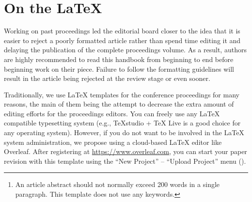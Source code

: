 \documentclass[a4paper]{jpconf}
\begin{document}


\begin{abstract}
This article provides a detailed guide on formatting papers for publication in \iopp\ journals. Based on the ``jpconf'' document class, it offers an overview of the essential formatting elements and common variations authors should utilize when preparing their manuscripts. The paper covers aspects such as structuring the document, formatting text and equations, inserting figures and tables, and managing citations and references using \BibTeX{}. Additionally, it provides best practices for exporting citations. This guide aims to streamline the submission process, enhance the quality of manuscripts, and ensure compliance with \iopp{} standards. By following these instructions, authors can improve their chances of successful publication and contribute to the efficiency of the peer review and publishing process.\footnote{An article abstract should not normally exceed 200 words in a single paragraph. This template does not use any keywords.}
\end{abstract}
%

\section{On the \LaTeX}

Working on past proceedings led the editorial board closer to the idea that it is easier to reject a poorly formatted article rather than spend time editing it and delaying the publication of the complete proceedings volume. As a result, authors are highly recommended to read this handbook from beginning to end before beginning work on their piece. Failure to follow the formatting guidelines will result in the article being rejected at the review stage or even sooner.

Traditionally, we use \LaTeX{} templates for the conference proceedings for many reasons, the main of them being the attempt to decrease the extra amount of editing efforts for the proceedings editors. You can freely use any \LaTeX{} compatible typesetting system (e.g., TeXstudio + TeX Live is a good choice for any operating system). However, if you do not want to be involved in the \LaTeX{} system administration, we propose using a cloud-based \LaTeX{} editor like Overleaf.
After registering at \url{https://www.overleaf.com}, you can start your paper revision with this template using the ``New Project'' -- ``Upload Project'' menu ().
\end{document}
